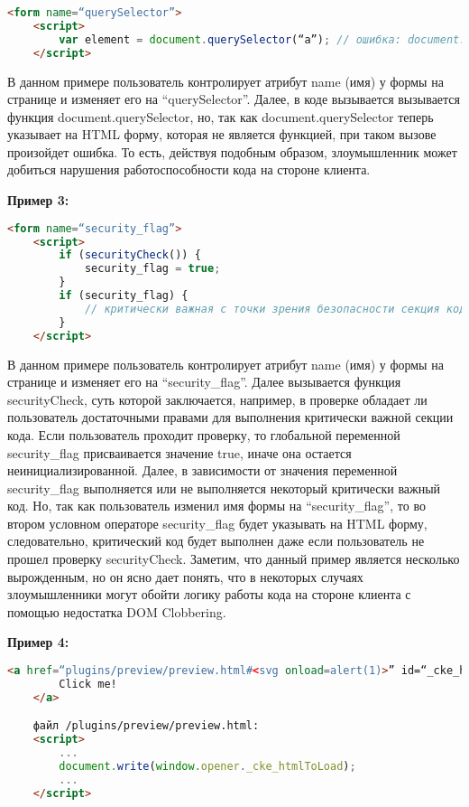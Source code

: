 \begin{lstlisting}[language=HTML]
	<form name=“querySelector”>
	<script>
		var element = document.querySelector(“a”); // ошибка: document.querySelector указывает на <form name=“querySelector”
	</script>
\end{lstlisting}
\bigskip

В данном примере пользователь контролирует атрибут name (имя) у формы на странице и изменяет его на “querySelector”. Далее, в коде вызывается вызывается функция document.querySelector, но, так как document.querySelector теперь указывает на HTML форму, которая не является функцией, при таком вызове произойдет ошибка.
То есть, действуя подобным образом, злоумышленник может добиться нарушения работоспособности кода на стороне клиента.

\bigskip
\textbf{Пример 3:}

\begin{lstlisting}[language=HTML]
	<form name=“security_flag”>
	<script>
		if (securityCheck()) {
			security_flag = true;
		}
		if (security_flag) {
			// критически важная с точки зрения безопасности секция кода
		}
	</script>
\end{lstlisting}
\bigskip

В данном примере пользователь контролирует атрибут name (имя) у формы на странице и изменяет его на “security\_flag”. Далее вызывается функция \\securityCheck, суть которой заключается, например, в проверке обладает ли пользователь достаточными правами для выполнения критически важной секции кода. Если пользователь проходит проверку, то глобальной переменной security\_flag присваивается значение true, иначе она остается неинициализированной. Далее, в зависимости от значения переменной security\_flag выполняется или не выполняется некоторый критически важный код. Но, так как пользователь изменил имя формы на “security\_flag”, то во втором условном операторе security\_flag будет указывать на HTML форму, следовательно, критический код будет выполнен даже если пользователь не прошел проверку securityCheck.
Заметим, что данный пример является несколько вырожденным, но он ясно дает понять, что в некоторых случаях злоумышленники могут обойти логику работы кода на стороне клиента с помощью недостатка DOM Clobbering.

\bigskip
\textbf{Пример 4:}

\begin{lstlisting}[language=HTML]
	<a href=“plugins/preview/preview.html#<svg onload=alert(1)>” id=“_cke_htmlToLoad” target=“_blank”>
		Click me!
	</a>

	файл /plugins/preview/preview.html:
	<script>
		...
		document.write(window.opener._cke_htmlToLoad);
		...
	</script>
\end{lstlisting}
\bigskip



